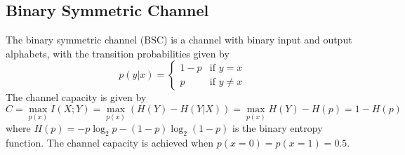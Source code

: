 \documentclass[../main.tex]{subfiles}
\begin{document}
\subsection{Binary Symmetric Channel}
The binary symmetric channel (BSC) is a channel with binary input and output alphabets, with the transition probabilities given by
\begin{equation}
	p(y|x) = \begin{cases}
		1-p & \text{if } y=x      \\
		p   & \text{if } y \neq x
	\end{cases}
\end{equation}
The channel capacity is given by
\begin{equation}
	C = \max_{p(x)} I(X;Y) = \max_{p(x)} (H(Y) - H(Y|X)) = \max_{p(x)} H(Y) - H(p) = 1 - H(p)
\end{equation}
where $H(p) = -p \log_2 p - (1-p) \log_2 (1-p)$ is the binary entropy function. The channel capacity is achieved when $p(x=0) = p(x=1) = 0.5$.
\end{document}
